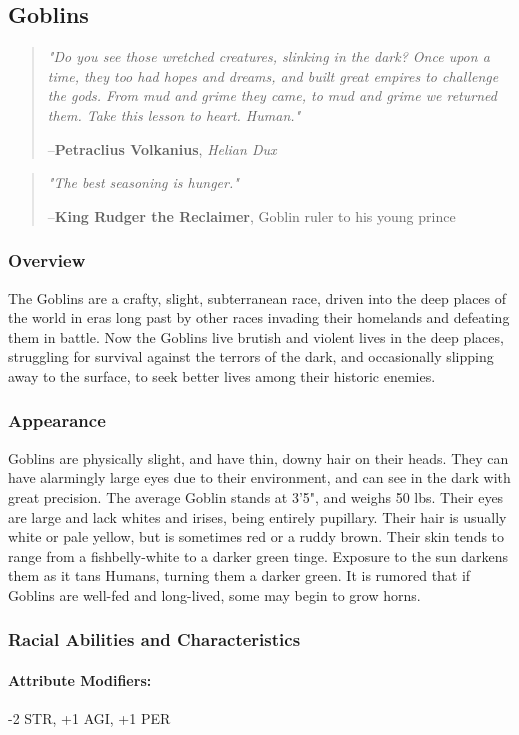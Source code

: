 \documentclass[oneside,11pt,english]{book}
\begin{document}
\subsection{Goblins}\label{sec:goblins}
\begin{quotation}
  \emph{"Do you see those wretched creatures, slinking in the dark? Once upon a time, they too had hopes and dreams, and built great empires to challenge the gods. From mud and grime they came, to mud and grime we returned them. Take this lesson to heart. Human."}\par
  \hfill--\textbf{Petraclius Volkanius}, \textit{Helian Dux}
\end{quotation}
\begin{quote} 
  \emph{"The best seasoning is hunger."}

  \hfill--\textbf{King Rudger the Reclaimer}, Goblin ruler to his young prince 
\end{quote}
\subsubsection*{Overview} 
The Goblins are a crafty, slight, subterranean race, driven into the deep places of the world in eras long 
past by other races invading their homelands and defeating them in battle. Now the Goblins live brutish 
and violent lives in the deep places, struggling for survival against the terrors of the dark, and 
occasionally slipping away to the surface, to seek better lives among their historic enemies. 
\subsubsection*{Appearance} 
Goblins are physically slight, and have thin, downy hair on their heads. They can have alarmingly large 
eyes due to their environment, and can see in the dark with great precision. The average Goblin stands at 
3'5", and weighs 50 lbs. Their eyes are large and lack whites and irises, being entirely pupillary. Their 
hair is usually white or pale yellow, but is sometimes red or a ruddy brown. Their skin tends to range 
from a fishbelly-white to a darker green tinge. Exposure to the sun darkens them as it tans Humans, 
turning them a darker green. It is rumored that if Goblins are well-fed and long-lived, some may begin to 
grow horns. 
\subsubsection*{Racial Abilities and Characteristics} 
\paragraph{Attribute Modifiers:} -2 STR, +1 AGI, +1 PER 
\end{document}
